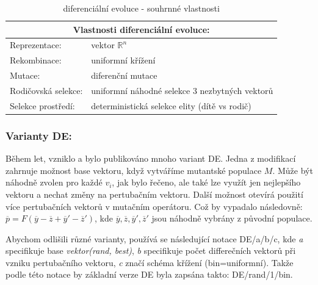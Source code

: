 \begin{table}[h]\centering
\begin{tabular}{ l l }
    \multicolumn{2}{c}{Vlastnosti diferenciální evoluce:} \\
    \hline \hline
    Reprezentace: & vektor $\mathbb{R}^n$ \\
    \hline  
    Rekombinace: & uniformní křížení \\
    \hline  
    Mutace: & diferenční mutace \\
    \hline   
    Rodičovská selekce: & uniformní náhodné selekce 3 nezbytných vektorů \\
    \hline   
    Selekce prostředí: & deterministická selekce elity (dítě vs rodič) \\
  \end{tabular}
\caption{diferenciální evoluce - souhrnné vlastnosti}
\end{table} 
\par
\subsubsection{Varianty DE:}
Během let, vzniklo a bylo publikováno mnoho variant DE. Jedna z modifikací zahrnuje možnost base vektoru, když vytváříme mutantské populace $M$. Může být náhodně zvolen pro každé $v_i$, jak bylo řečeno, ale také lze využít jen nejlepšího vektoru a nechat změny na pertubačním vektoru. Další možnost otevírá použití více pertubačních vektorů v mutačním operátoru. Což by vypadalo následovně: 
$\overline{p} = F (\overline{y}-\overline{z} + \overline{y}' - \overline{z}')$, kde $\overline{y}, \overline{z}, \overline{y}',\overline{z}'$ jsou náhodně vybrány z původní populace.\par
Abychom odlišili různé varianty, používá se následující notace DE/a/b/c, kde \textit{a} specifikuje base \textit{vektor(rand, best)}, \textit{b} specifikuje počet differečních  vektorů při vzniku pertubačního vektoru, \textit{c} značí schéma křížení (bin=uniformní). Takže podle této notace by základní verze DE byla zapsána takto: DE/rand/1/bin. 

